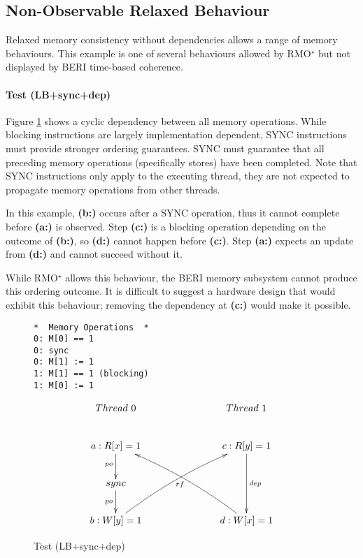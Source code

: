 \clearpage
	\subsection{Non-Observable Relaxed Behaviour}
		Relaxed memory consistency without dependencies allows a range of memory behaviours. This example is one of several behaviours allowed by RMO{\large$^\star$} but not displayed by BERI time-based coherence.
\paragraph{Test (LB+sync+dep)}
		Figure \ref{lb_sync_dep_diagram} shows a cyclic dependency between all memory operations. While blocking instructions are largely implementation dependent, SYNC instructions must provide stronger ordering guarantees. SYNC must guarantee that all preceding memory operations (specifically stores) have been completed. Note that SYNC instructions only apply to the executing thread, they are not expected to propagate memory operations from other threads. 
		
		In this example, \textbf{(b:)} occurs after a SYNC operation, thus it cannot complete before \textbf{(a:)} is observed. Step \textbf{(c:)} is a blocking operation depending on the outcome of \textbf{(b:)}, so \textbf{(d:)} cannot happen before \textbf{(c:)}. Step \textbf{(a:)} expects an update from \textbf{(d:)} and cannot succeed without it.
		
		While RMO{\large$^\star$} allows this behaviour, the BERI memory subsystem cannot produce this ordering outcome.
		It is difficult to suggest a hardware design that would exhibit this behaviour; removing the dependency at \textbf{(c:)} would make it possible. 
		

\begin{figure}[!h]
\begin{tcolorbox}[
colback=orange!1!white,
colframe=orange!75!white]
\begin{center}
\begin{BVerbatim}
*  Memory Operations  *
0: M[0] == 1
0: sync
0: M[1] := 1
1: M[1] == 1 (blocking)
1: M[0] := 1
\end{BVerbatim}
\end{center}

\vspace{1mm}

\begin{displaymath}
	\xymatrix{
		Thread \ 0 & \ \ \ \ \ \  & Thread \ 1 \\
		a: R[x] = 1 \ar[d]_{po} & & c: R[y] = 1 \ar[dd]^{dep} \\
		sync \ar[d]_{po} & & \\
		b: W[y] = 1 \ar@/^/@{->}[uurr] & & d: W[x] = 1 \ar@/_/@{->}[uull]^{rf}
	}
\end{displaymath}
\end{tcolorbox}
\caption{Test (LB+sync+dep)}
\label{lb_sync_dep_diagram}
\end{figure}


